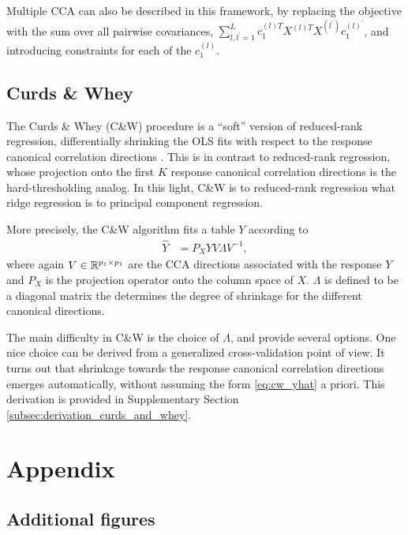 \documentclass{article}
\begin{document}
Multiple CCA can also be described in this framework, by replacing the objective
with the sum over all pairwise covariances, $\sum_{l, l^{\prime} = 1}^{L}
c_{1}^{(l) T}X^{(l) T}X^{(l^{\prime})}c_{1}^{(l)^{\prime}}$, and introducing
constraints for each of the $c_{1}^{(l)}$.

\subsection{Curds \& Whey}
\label{subsec:cw}

The Curds \& Whey (C\&W) procedure is a ``soft'' version of reduced-rank
regression, differentially shrinking the OLS fits with respect to the response
canonical correlation directions \citep{breiman1997predicting}. This is in
contrast to reduced-rank regression, whose projection onto the first $K$
response canonical correlation directions is the hard-thresholding analog. In
this light, C\&W is to reduced-rank regression what ridge regression is to
principal component regression.

More precisely, the C\&W algorithm fits a table $Y$ according to
\begin{align}
  \hat{Y} &= P_{X}YV\Lambda V^{-1}, \label{eq:cw_yhat}
\end{align}
where again $V \in \mathbb{R}^{p_{1} \times p_{1}}$ are the CCA directions
associated with the response $Y$ and $P_{X}$ is the projection operator onto the
column space of $X$. $\Lambda$ is defined to be a diagonal matrix the determines
the degree of shrinkage for the different canonical directions.

The main difficulty in C\&W is the choice of $\Lambda$, and
\citep{breiman1997predicting} provide several options. One nice choice can be
derived from a generalized cross-validation point of view. It turns out that
shrinkage towards the response canonical correlation directions emerges
automatically, without assuming the form \ref{eq:cw_yhat} a priori. This
derivation is provided in Supplementary Section
\ref{subsec:derivation_curds_and_whey}.




\section{Appendix}

\subsection{Additional figures}
\end{document}
